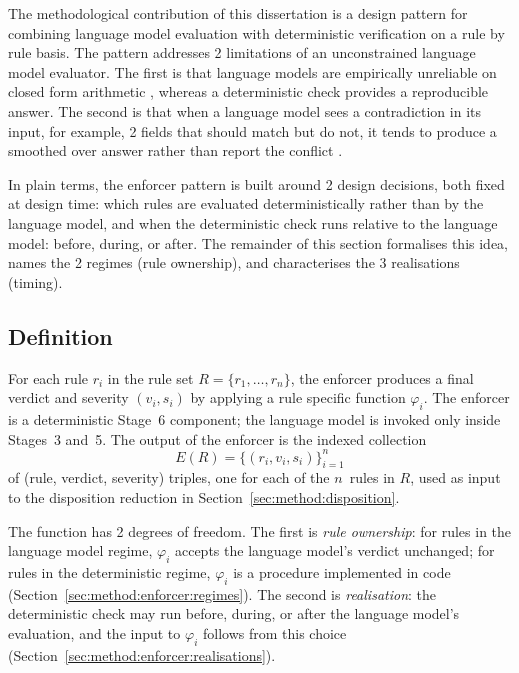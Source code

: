 The methodological contribution of this dissertation is a design pattern for combining language model evaluation with deterministic verification on a rule by rule basis. The pattern addresses 2 limitations of an unconstrained language model evaluator. The first is that language models are empirically unreliable on closed form arithmetic \citep{arkoudas2023,dziri2024}, whereas a deterministic check provides a reproducible answer. The second is that when a language model sees a contradiction in its input, for example, 2 fields that should match but do not, it tends to produce a smoothed over answer rather than report the conflict \citep{huang2024hallucination}.

In plain terms, the enforcer pattern is built around 2 design decisions, both fixed at design time: which rules are evaluated deterministically rather than by the language model, and when the deterministic check runs relative to the language model: before, during, or after. The remainder of this section formalises this idea, names the 2 regimes (rule ownership), and characterises the 3 realisations (timing).

\subsection{Definition}
\label{sec:method:enforcer:def}

For each rule $r_i$ in the rule set $R = \{r_1, \ldots, r_n\}$, the enforcer produces a final verdict and severity $(v_i, s_i)$ by applying a rule specific function $\varphi_i$. The enforcer is a deterministic Stage~6 component; the language model is invoked only inside Stages~3 and~5. The output of the enforcer is the indexed collection
%
\begin{equation}\label{eq:enforcer}
  E(R) = \{(r_i, v_i, s_i)\}_{i=1}^{n}
\end{equation}
%
of (rule, verdict, severity) triples, one for each of the $n$~rules in $R$, used as input to the disposition reduction in Section~\ref{sec:method:disposition}.

The function has 2 degrees of freedom. The first is \emph{rule ownership}: for rules in the language model regime, $\varphi_i$ accepts the language model's verdict unchanged; for rules in the deterministic regime, $\varphi_i$ is a procedure implemented in code (Section~\ref{sec:method:enforcer:regimes}). The second is \emph{realisation}: the deterministic check may run before, during, or after the language model's evaluation, and the input to $\varphi_i$ follows from this choice (Section~\ref{sec:method:enforcer:realisations}).

